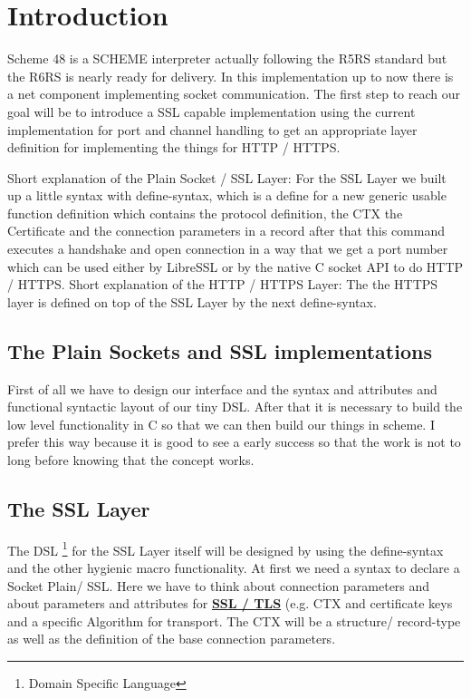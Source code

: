 \documentclass[10pt,a4paper,english]{article}
\begin{document}
\section{Introduction}

\begin{flushleft}
Scheme 48 is a SCHEME interpreter actually following the R5RS standard but the R6RS is nearly ready for delivery. In this implementation up to now there is a net component implementing socket communication.
The first step to reach our goal will be to introduce a SSL capable implementation using the current implementation for port and channel handling to get an appropriate layer definition for  implementing the things for HTTP / HTTPS.
\end{flushleft}
\begin{flushleft}
Short explanation of the Plain Socket / SSL Layer:
For the SSL Layer we built up a little syntax with define-syntax,  which is a define for a new generic usable function definition which contains the protocol definition, the CTX the Certificate and the connection parameters in a record after that this command executes a handshake and  open connection in a way that we  get a port number which can be used either by LibreSSL or by the native C socket API to do HTTP / HTTPS.
Short explanation of the HTTP / HTTPS Layer:
The the HTTPS layer  is defined on top of the SSL Layer by the  next define-syntax.
\end{flushleft}

\subsection{The Plain Sockets and SSL implementations }
\begin{flushleft}
First of all we have to design our interface and the syntax and attributes and functional syntactic layout of our tiny DSL. After that it is necessary to build the low level functionality in C so that we can then build our things in scheme. I prefer this way because it is good to see a early success so that the work is not to long before knowing that the concept works. 
\end{flushleft}

\subsection{The SSL Layer}
\begin{flushleft}
The DSL \footnote{Domain Specific Language} for the SSL Layer itself will be designed by using the define-syntax and the other hygienic macro functionality. At first we need a syntax to declare a Socket Plain/ SSL. Here we have to think about connection parameters and about parameters and attributes for \textbf{\underline {SSL / TLS}} (e.g. CTX and certificate keys and a specific Algorithm for transport. 
The CTX will be a structure/ record-type as well as the definition of the base connection parameters. \end{flushleft}
\end{document}
